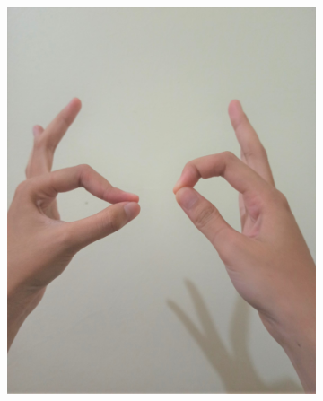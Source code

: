 \documentclass[conference]{IEEEtran}
\begin{document}
\begin{figure} [h]
\begin{center}
\begin{subfigure}[t]{0.11\textwidth}
				\includegraphics[width=\textwidth]{img/pola2.jpg}
				\caption{\label{fig:gs2}}
			\end{subfigure}
			\hspace{0.1em}
			\begin{subfigure}[t]{0.11\textwidth}

\end{subfigure}
\end{center}
\end{figure}
\end{document}
